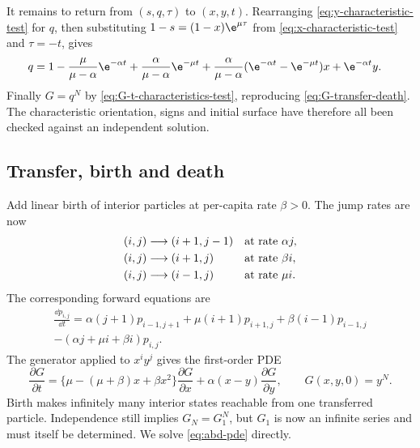 It remains to return from \((s,q,\tau)\) to \((x,y,t)\).  Rearranging
\cref{eq:y-characteristic-test} for \(q\), then substituting
\(1-s=(1-x)\e^{\mu\tau}\) from \cref{eq:x-characteristic-test} and
\(\tau=-t\), gives
\begin{equation}
\begin{aligned}
  q={}&1-\frac{\mu}{\mu-\alpha}\e^{-\alpha t}
    +\frac{\alpha}{\mu-\alpha}\e^{-\mu t}
    +\frac{\alpha}{\mu-\alpha}
       (\e^{-\alpha t}-\e^{-\mu t})x
    +\e^{-\alpha t}y.
\end{aligned}
  \label{eq:q-recovered-test}
\end{equation}
Finally \(G=q^N\) by \cref{eq:G-t-characteristics-test}, reproducing
\cref{eq:G-transfer-death}.  The characteristic orientation, signs and initial
surface have therefore all been checked against an independent solution.

\subsection{Transfer, birth and death}
\label{sec:transfer-birth-death}

Add linear birth of interior particles at per-capita rate \(\beta>0\).  The jump
rates are now
\begin{align}
  (i,j)&\longrightarrow(i+1,j-1) &&\text{at rate }\alpha j,
  \notag\\
  (i,j)&\longrightarrow(i+1,j)   &&\text{at rate }\beta i,
  \notag\\
  (i,j)&\longrightarrow(i-1,j)   &&\text{at rate }\mu i.
  \label{eq:abd-rates}
\end{align}
The corresponding forward equations are
\begin{multline}
  \frac{\dd p_{i,j}}{\dd t}
  =\alpha(j+1)p_{i-1,j+1}
   +\mu(i+1)p_{i+1,j}
   +\beta(i-1)p_{i-1,j}\\
   -(\alpha j+\mu i+\beta i)p_{i,j}.
  \label{eq:abd-forward}
\end{multline}
The generator applied to \(x^iy^j\) gives the first-order PDE
\begin{equation}
  \frac{\partial G}{\partial t}
  =\{\mu-(\mu+\beta)x+\beta x^2\}\frac{\partial G}{\partial x}
   +\alpha(x-y)\frac{\partial G}{\partial y},
  \qquad G(x,y,0)=y^N.
  \label{eq:abd-pde}
\end{equation}
Birth makes infinitely many interior states reachable from one transferred
particle.  Independence still implies \(G_N=G_1^N\), but \(G_1\) is now an infinite
series and must itself be determined.  We solve \cref{eq:abd-pde} directly.

